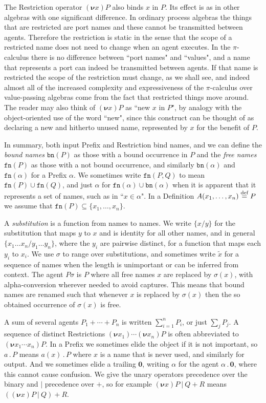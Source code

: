 \documentclass[10pt,a4paper]{article}
\newcommand{\resp}[1]{(\boldsymbol{\nu}#1)}
\newcommand{\res}[2]{\resp{#1}#2}
\newcommand{\nil}{\mathbf{0}}
\newcommand{\inpp}[2]{#1(#2)}
\newcommand{\prefix}[2]{{#1}\,.\,#2}
\newcommand{\inp}[3]{\prefix{\inpp{#1}{#2}}{#3}}
\newcommand{\defi}{\buildrel \text{def}\over =}
\newcommand{\para}{\:|\:}
\newcommand{\fn}{\texttt{fn}}
\newcommand{\bn}{\texttt{bn}}
\begin{document}
The Restriction operator $\res{x}{P}$ also binds $x$ in $P$. Its effect is as in other algebras with one significant difference. In ordinary process algebras the things that are restricted are port names and these cannot be transmitted between agents. Therefore the restriction is static in the sense that the scope of a restricted name does not need to change when an agent executes. In the $\pi$-calculus there is no difference between ``port names" and ``values", and a name that represents a port can indeed be transmitted between agents. If that name is restricted the scope of the restriction must change, as we shall see, and indeed almost all of the increased complexity and expressiveness of the $\pi$-calculus over value-passing algebras come from the fact that restricted things move around. The reader may also think of $\res{x}{P}$ as ``new $x$ in $P$", by analogy with the object-oriented use of the word ``new", since this construct can be thought of as declaring a new and hitherto unused name, represented by $x$ for the benefit of $P$.

In summary, both input Prefix and Restriction bind names, and we can define the \emph{bound names} $\bn(P)$ as those with a bound occurrence in $P$ and the \emph{free names} $\fn(P)$ as those with a not bound occurrence, and similarly $\bn(\alpha)$ and $\fn(\alpha)$ for a Prefix $\alpha$. We sometimes write $\fn(P, Q)$ to mean $\fn(P) \cup \fn(Q)$, and just $\alpha$ for $\fn(\alpha) \cup \bn(\alpha)$ when it is apparent that it represents a set of names, such as in ``$x \in \alpha$". In a Definition $A(x_1,\dots,x_n) \defi P$ we assume that $\fn(P) \subseteq \{x_1,\dots,x_n\}$.

A \emph{substitution} is a function from names to names. We write $\{x/y\}$ for the substitution that maps $y$ to $x$ and is identity for all other names, and in general $\{x_1 \dots x_n / y_1 \dots y_n\}$, where the $y_i$ are pairwise distinct, for a function that maps each $y_i$ to $x_i$. We use $\sigma$ to range over substitutions, and sometimes write $\tilde{x}$ for a sequence of names when the length is unimportant or can be inferred from context. The agent $P\sigma$ is $P$ where all free names $x$ are replaced by $\sigma(x)$, with alpha-conversion wherever needed to avoid captures. This means that bound names are renamed such that whenever $x$ is replaced by $\sigma(x)$ then the so obtained occurrence of $\sigma(x)$ is free.

A sum of several agents $P_1 + \cdots + P_n$ is written $\sum_{i=1}^n P_i$, or just $\sum_j P_j$. A sequence of distinct Restrictions $\resp{x_1} \cdots \res{x_n}{P}$ is often abbreviated to $\res{x_1 \cdots x_n}{P}$. In a Prefix we sometimes elide the object if it is not important, so $\prefix{a}{P}$ means $\inp{a}{x}{P}$ where $x$ is a name that is never used, and similarly for output. And we sometimes elide a trailing $\nil$, writing $\alpha$ for the agent $\prefix{\alpha}{\nil}$, where this cannot cause confusion. We give the unary operators precedence over the binary and $|$ precedence over $+$, so for example $\res{x}{P} \para Q + R$ means $(\res{x}{P} \para Q) + R$.
\end{document}
